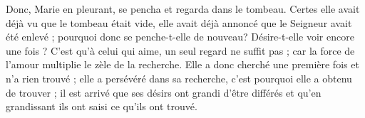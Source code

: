  Donc, Marie en pleurant, se pencha et regarda dans le tombeau. Certes elle avait déjà vu que le tombeau était vide, elle avait déjà annoncé que le Seigneur avait été enlevé ; pourquoi donc se penche-t-elle de nouveau? Désire-t-elle voir encore une fois ? C'est qu’à celui qui aime, un seul regard ne suffit pas ; car la force de l’amour multiplie le zèle de la recherche. Elle a donc cherché une première fois et n’a rien trouvé ; elle a persévéré dans sa recherche, c’est pourquoi elle a obtenu de trouver ; il est arrivé que ses désirs ont grandi d’être différés et qu’en grandissant ils ont saisi ce qu’ils ont trouvé.